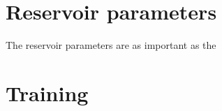 \section{Reservoir parameters}

The reservoir parameters are as important as the 

\section{Training}
